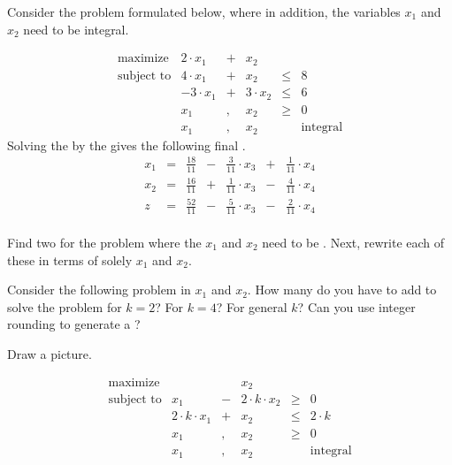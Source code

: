 \begin{exercise}
Consider the problem formulated below, where in addition, the variables $x_1$ and $x_2$ need to be integral.

\begin{equation}
\begin{array}{rrcrcr}
\mbox{maximize}&2\cdot x_1&+&x_2\\
\mbox{subject to}&4\cdot x_1&+&x_2&\leq&8\\
&-3\cdot x_1&+&3\cdot x_2&\leq&6\\
&x_1&,&x_2&\geq&0\\
&x_1&,&x_2&&\mbox{integral}
\end{array}
\end{equation}
Solving the  by the  gives the following final .
\begin{equation}
\begin{array}{rcrcrcr}
x_1&=&\tfrac{18}{11}&-&\tfrac{3}{11}\cdot x_3&+&\tfrac{1}{11}\cdot x_4\\
x_2&=&\tfrac{16}{11}&+&\tfrac{1}{11}\cdot x_3&-&\tfrac{4}{11}\cdot x_4\\\hline
z&=&\tfrac{52}{11}&-&\tfrac{5}{11}\cdot x_3&-&\tfrac{2}{11}\cdot x_4
\end{array}
\end{equation}
\paragraph{}
Find two  for the problem where the  $x_1$ and $x_2$ need to be . Next, rewrite each of these  in terms of solely $x_1$ and $x_2$.
\end{exercise}
\begin{exercise}
Consider the following problem in  $x_1$ and $x_2$. How many  do you have to add to solve the problem for $k=2$? For $k=4$? For general $k$? Can you use integer rounding to generate a ?
\begin{hint}
Draw a picture.
\end{hint}
\begin{equation}
\begin{array}{rrcrcr}
\mbox{maximize}&&&x_2\\
\mbox{subject to}&x_1&-&2\cdot k\cdot x_2&\geq&0\\
&2\cdot k\cdot x_1&+&x_2&\leq&2\cdot k\\
&x_1&,&x_2&\geq&0\\
&x_1&,&x_2&&\mbox{integral}
\end{array}
\end{equation}
\end{exercise}
